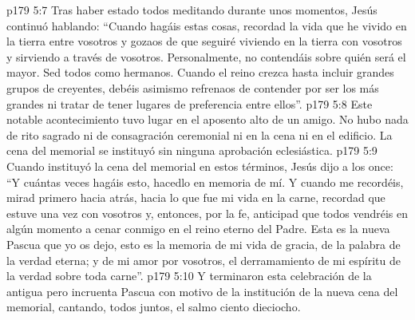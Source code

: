 \vs p179 5:7 \pc Tras haber estado todos meditando durante unos momentos, Jesús continuó hablando: “Cuando hagáis estas cosas, recordad la vida que he vivido en la tierra entre vosotros y gozaos de que seguiré viviendo en la tierra con vosotros y sirviendo a través de vosotros. Personalmente, no contendáis sobre quién será el mayor. Sed todos como hermanos. Cuando el reino crezca hasta incluir grandes grupos de creyentes, debéis asimismo refrenaos de contender por ser los más grandes ni tratar de tener lugares de preferencia entre ellos”.
\vs p179 5:8 Este notable acontecimiento tuvo lugar en el aposento alto de un amigo. No hubo nada de rito sagrado ni de consagración ceremonial ni en la cena ni en el edificio. La cena del memorial se instituyó sin ninguna aprobación eclesiástica.
\vs p179 5:9 Cuando instituyó la cena del memorial en estos términos, Jesús dijo a los once: “Y cuántas veces hagáis esto, hacedlo en memoria de mí. Y cuando me recordéis, mirad primero hacia atrás, hacia lo que fue mi vida en la carne, recordad que estuve una vez con vosotros y, entonces, por la fe, anticipad que todos vendréis en algún momento a cenar conmigo en el reino eterno del Padre. Esta es la nueva Pascua que yo os dejo, esto es la memoria de mi vida de gracia, de la palabra de la verdad eterna; y de mi amor por vosotros, el derramamiento de mi espíritu de la verdad sobre toda carne”.
\vs p179 5:10 Y terminaron esta celebración de la antigua pero incruenta Pascua con motivo de la institución de la nueva cena del memorial, cantando, todos juntos, el salmo ciento dieciocho.
